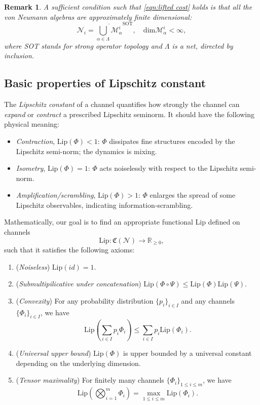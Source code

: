 \documentclass[11pt,reqno]{amsart}
\numberwithin{equation}{section}
\newtheorem{remark}[lemma]{Remark}
\newcommand{\mb}{\mathbb}
\newcommand{\mc}{\mathcal}
\newcommand{\Lip}{\mathrm{Lip}}
\begin{document}
\begin{remark}
    A sufficient condition such that \eqref{eqn:lifted cost} holds is that all the von Neumann algebras are approximately finite dimensional:
\begin{equation}
  \mc N_i = \overline{\bigcup_{\alpha \in \Lambda} \mc M_\alpha^i}^{\mathrm{SOT}},\quad \mathrm{dim}\mc M_\alpha^i < \infty,
\end{equation}
where SOT stands for strong operator topology and $\Lambda$ is a net, directed by inclusion.
\end{remark}
\subsection{Basic properties of Lipschitz constant}\label{sec:basic Lipschitz constant}
The \emph{Lipschitz constant} of a channel quantifies how strongly the
channel can \emph{expand} or \emph{contract} a prescribed Lipschitz seminorm. It should have the following physical meaning:
\begin{itemize}
\item \emph{Contraction}, $\Lip(\Phi)<1$: 
      $\Phi$ dissipates fine structures encoded by the Lipschitz semi-norm; the dynamics
      is mixing.
\item \emph{Isometry}, \(\Lip(\Phi)=1\): 
      $\Phi$ acts noiselessly with respect to the Lipschitz semi-norm.
\item \emph{Amplification/scrambling}, \(\Lip(\Phi)>1\): $\Phi$ enlarges the spread of some Lipschitz observables, indicating information‑scrambling.
\end{itemize}
Mathematically, our goal is to find an appropriate functional $\Lip$ defined on channels $$\Lip: \mathfrak{C}(\mc N)\to \mb R_{\ge 0},$$
such that it satisfies the following axioms:
\begin{enumerate}
\item (\textit{Noiseless}) $\Lip(id) = 1$.
\item (\textit{Submultipilicative under concatenation}) $\Lip(\Phi \circ \Psi) \le \Lip(\Phi) \Lip(\Psi)$. 
\item (\textit{Convexity}) For any probability distribution $\{p_i\}_{i\in I}$ and any channels $\{\Phi_i\}_{i \in I}$, we have 
\begin{equation}
\Lip(\sum_{i\in I} p_i\Phi_i) \le \sum_{i\in I} p_i \Lip(\Phi_i).
\end{equation} 
\item (\textit{Universal upper bound}) $\Lip(\Phi)$ is upper bounded by a universal constant depending on the underlying dimension.
\item (\textit{Tensor maximality}) For finitely many channels $\{\Phi_i\}_{1\le i \le m}$, we have 
\begin{equation}
\Lip(\bigotimes_{i=1}^m \Phi_i) = \max_{1\le i \le m} \Lip(\Phi_i).
\end{equation}
\end{enumerate}
\end{document}
